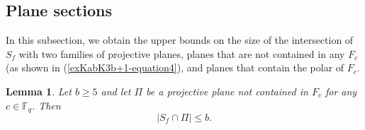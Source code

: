 \documentclass[11pt,a4paper]{article}
\newtheorem{lemma}[theorem]{Lemma}
\theoremstyle{definition}
\theoremstyle{remark}
\begin{document}
\subsection{Plane sections}
\label{sec:plane-sections}


In this subsection, we obtain the upper bounds on the size of the intersection of $S_f$ with two families of projective
planes, planes that are not contained in any $F_c$ (as shown in (\ref{exKabK3b+1-equation4}), and  planes that contain the polar of $F_c$.
\begin{lemma} \label{lem:plane-sections}
Let $b \geq 5$  and let $\Pi$ be a projective plane not contained in $F_c$ for any $c \in \mathbb{F}_q$. Then
\[
|S_f \cap \Pi| \leq b.
\]
\end{lemma}
\end{document}
